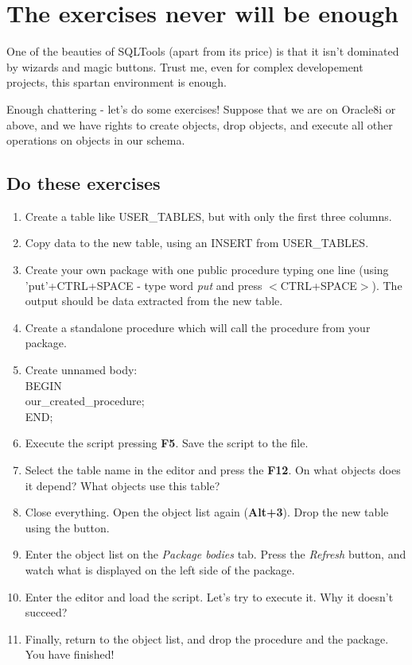 \documentclass[a4paper,titlepage]{article}
\begin{document}
\section{The exercises never will be enough}
One of the beauties of SQLTools (apart from its price) is that it isn't dominated by wizards and magic buttons. Trust me, even for complex developement projects, this spartan environment is enough. 

Enough chattering - let's do some exercises! Suppose that we are on Oracle8i or above, and we have rights to create objects, drop objects, and execute all other operations on objects in our schema.

\subsection{Do these exercises}
\begin{enumerate}
\item Create a table like USER\_TABLES, but with only the first three columns.
\item Copy data to the new table, using an INSERT from USER\_TABLES.
\item Create your own package with one public procedure typing one line (using 'put'+CTRL+SPACE - type word \emph{put} and press $<$CTRL+SPACE$>$).  The output should be data extracted from the new table.
\item Create a standalone procedure which will call the procedure from your package.
\item Create unnamed body:\\
\indent BEGIN\\
\indent \indent our\_created\_procedure;\\
\indent END;
\item Execute the script pressing \textbf{F5}. Save the script to the file.
\item Select the table name in the editor and press the \textbf{F12}. On what objects does it depend? What objects use this table?
\item Close everything. Open the object list again (\textbf{Alt+3}). Drop the new table using the button.
\item Enter the object list on the \emph{Package bodies} tab. Press the \emph{Refresh} button, and watch what is displayed on the left side of the package. 
\item Enter the editor and load the script. Let's try to execute it. Why it doesn't succeed?
\item Finally, return to the object list, and drop the procedure and the package. You have finished!
\end{enumerate}
\end{document}
